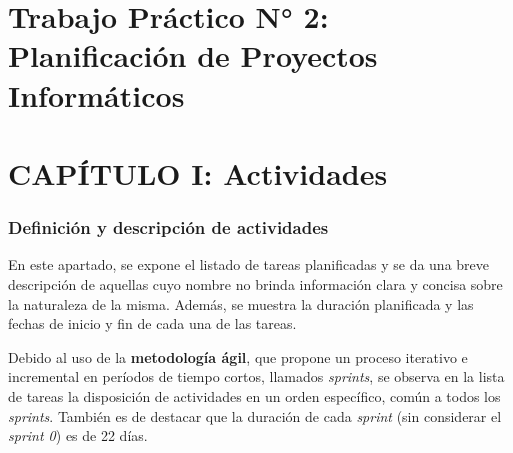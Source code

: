\section{Trabajo Práctico N° 2: Planificación de Proyectos Informáticos}
\section{CAPÍTULO I: Actividades}
\subsubsection{Definición y descripción de actividades}
En este apartado, se expone el listado de tareas planificadas y se da una breve descripción de aquellas cuyo nombre no brinda información clara y concisa sobre la naturaleza de la misma.
Además, se muestra la duración planificada y las fechas de inicio y fin de cada una de las tareas.

Debido al uso de la \textbf{metodología ágil}, que propone un proceso iterativo e incremental en períodos de tiempo cortos, llamados \textit{sprints}, se observa en la lista de tareas la disposición de actividades en un orden específico, común a todos los \textit{sprints}.
También es de destacar que la duración de cada \textit{sprint} (sin considerar el \textit{sprint 0}) es de 22 días.


